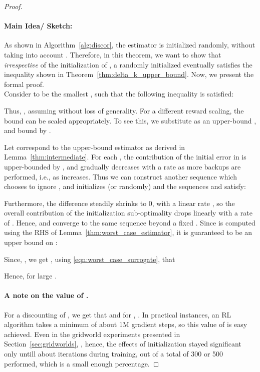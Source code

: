 \documentclass[jmlr]{article}
\begin{document}
\begin{proof}
\paragraph{Main Idea/ Sketch:} As shown in Algorithm~\ref{alg:discor}, the estimator  is initialized randomly, without taking into account . Therefore, in this theorem, we want to show that \textit{irrespective} of the initialization of , a randomly initialized  eventually satisfies the inequality shown in Theorem~\ref{thm:delta_k_upper_bound}. Now, we present the formal proof. \\

Consider  to be the smallest , such that the following inequality is satisfied:

Thus, , assuming  without loss of generality. For a different reward scaling, the bound can be scaled appropriately. To see this, we substitute  as an upper-bound , and  bound  by . 

Let  correspond to the upper-bound estimator as derived in Lemma~\ref{thm:intermediate}. For each , the contribution of the initial error  in  is upper-bounded by , and gradually decreases with a rate  as more backups are performed, i.e., as  increases. Thus we can construct another sequence  which chooses to ignore , and initializes  (or randomly) and the sequences  and  satisfy:

Furthermore, the difference  steadily shrinks to 0, with a linear rate , so the overall contribution of the initialization sub-optimality  drops linearly with a rate of . Hence,  and  converge to the same sequence beyond a fixed . Since  is computed using the RHS of Lemma~\ref{thm:worst_case_estimator}, it is guaranteed to be an upper bound on :

Since, , we get , using \ref{eqn:worst_case_surrogate}, that 

Hence,  for large .
\paragraph{A note on the value of .} For a discounting of , we get that  and for , . In practical instances, an RL algorithm takes a minimum of about  1M gradient steps, so this value of  is easy achieved. Even in the gridworld experiments presented in Section~\ref{sec:gridworlds}, , hence, the effects of initialization stayed significant only untill about  iterations during training, out of a total of 300 or 500 performed, which is a small enough percentage.
\end{proof}
\end{document}
